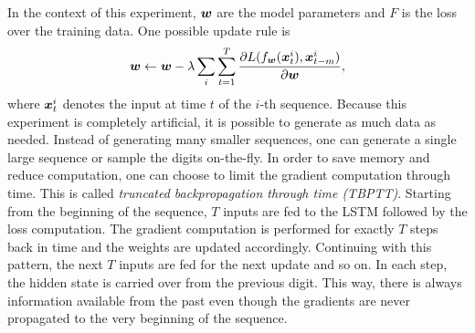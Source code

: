 		In the context of this experiment, $\bm{w}$ are the model parameters and $F$ is the loss over the training data. 
		One possible update rule is
		\begin{equation}
			\bm{w} \leftarrow 
			\bm{w} - \lambda 
			\sum_{i}
			\sum_{t = 1}^{T}
			\frac{\partial L(f_{\bm{w}}(\bm{x}_t^{i}), \bm{x}_{t - m}^{i})}{\partial \bm{w}}, 
		\end{equation}
		where $\bm{x}_t^{i}$ denotes the input at time $t$ of the $i$-th sequence.
		Because this experiment is completely artificial, it is possible to generate as much data as needed.
		Instead of generating many smaller sequences, one can generate a single large sequence or sample the digits on-the-fly.
		In order to save memory and reduce computation, one can choose to limit the gradient computation through time.
		This is called \emph{truncated backpropagation through time (TBPTT)}. 
		Starting from the beginning of the sequence, $T$ inputs are fed to the LSTM followed by the loss computation.
		The gradient computation is performed for exactly $T$ steps back in time and the weights are updated accordingly. 
		Continuing with this pattern, the next $T$ inputs are fed for the next update and so on.
		In each step, the hidden state is carried over from the previous digit.
		This way, there is always information available from the past even though the gradients are never propagated to the very beginning of the sequence.
		
